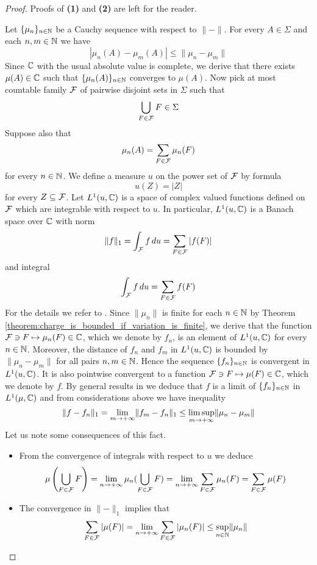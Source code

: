 \begin{proof}
    Proofs of \textbf{(1)} and \textbf{(2)} are left for the reader.

    Let $\{\mu_n\}_{n\in {\mathbb N}}$ be a Cauchy sequence with respect to $\lVert-\rVert$. For every $A \in \Sigma$ and each $n,m\in {\mathbb N}$ we have
    $$|\mu_n(A) - \mu_m(A)|\leq \lVert \mu_n - \mu_m\rVert$$
    Since ${\mathbb C}$ with the usual absolute value is complete, we derive that there exists $\mu(A) \in {\mathbb C}$ such that $\{\mu_n(A)\}_{n\in {\mathbb N}}$ converges to $\mu(A)$. Now pick at most countable family ${\mathcal F}$ of pairwise disjoint sets in $\Sigma$ such that
    $$\bigcup_{F \in {\mathcal F}}F\in \Sigma$$
    Suppose also that
    $$\mu_n(A) = \sum_{F\in {\mathcal F}}\mu_n(F)$$
    for every $n \in {\mathbb N}$. We define a measure $u$ on the power set of ${\mathcal F}$ by formula
    $$u(Z) = |Z|$$
    for every $Z \subseteq {\mathcal F}$. Let $L^1(u,{\mathbb C})$ is a space of complex valued functions defined on ${\mathcal F}$ which are integrable with respect to $u$. In particular, $L^1(u,{\mathbb C})$ is a Banach space over ${\mathbb C}$ with norm
    $$\lVert f \rVert_1 = \int_{{\mathcal F}} f\,du = \sum_{F\in {\mathcal F}}|f(F)|$$
    and integral
    $$\int_{{\mathcal F}}f\,du = \sum_{F\in {\mathcal F}}f(F)$$
    For the details we refer to \cite{Integration}. Since $\lVert \mu_n\rVert$ is finite for each $n \in {\mathbb N}$ by Theorem \ref{theorem:charge_is_bounded_if_variation_is_finite}, we derive that the function ${\mathcal F} \ni F \mapsto \mu_n(F)\in {\mathbb C}$, which we denote by $f_n$, is an element of $L^1(u,{\mathbb C})$ for every $n \in {\mathbb N}$. Moreover, the distance of $f_n$ and $f_m$ in $L^1(u,{\mathbb C})$ is bounded by $\lVert \mu_n - \mu_m\rVert$ for all pairs $n,m \in {\mathbb N}$. Hence the sequence $\{f_n\}_{n \in {\mathbb N}}$ is convergent in $L^1(u,{\mathbb C})$. It is also pointwise convergent to a function ${\mathcal F} \ni F \mapsto \mu(F)\in {\mathbb C}$, which we denote by $f$. By general results in \cite{Integration} we deduce that $f$ is a limit of $\{f_n\}_{n\in {\mathbb N}}$ in $L^1(\mu,{\mathbb C})$ and from considerations above we have inequality
    $$\lVert f - f_n\rVert_1 = \lim_{m\rightarrow +\infty}\lVert f_m - f_n\rVert_1 \leq \limsup_{m \rightarrow +\infty}\lVert \mu_n - \mu_m\rVert$$
    Let us note some consequences of this fact.
    \begin{itemize}
        \item From the convergence of integrals with respect to $u$ we deduce
              $$\mu\left(\bigcup_{F\in {\mathcal F}}F\right) = \lim_{n\rightarrow +\infty}\mu_n(\bigcup_{F\in {\mathcal F}}F) = \lim_{n\rightarrow +\infty}\sum_{F\in {\mathcal F}}\mu_n(F) = \sum_{F\in {\mathcal F}}\mu(F)$$
        \item The convergence in $\lVert-\rVert_1$ implies that
              $$\sum_{F \in {\mathcal F}}|\mu(F)| = \lim_{n\rightarrow +\infty}\sum_{F\in {\mathcal F}}|\mu_n(F)| \leq \sup_{n\in {\mathbb N}}\lVert \mu_n\rVert$$

\end{itemize}
\end{proof}
